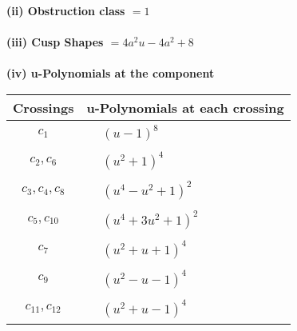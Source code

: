 \documentclass[1p]{elsarticle_modified}
\theoremstyle{definition}
\begin{document}
\flushleft \textbf{(ii) Obstruction class $= 1$}\\~\\
\flushleft \textbf{(iii) Cusp Shapes $= 4 a^2 u-4 a^2+8$}\\~\\
\newpage\renewcommand{\arraystretch}{1}
\flushleft \textbf{(iv) u-Polynomials at the component}\newline \\
\begin{tabular}{m{50pt}|m{274pt}}
Crossings & \hspace{64pt}u-Polynomials at each crossing \\
\hline $$\begin{aligned}c_{1}\end{aligned}$$&$\begin{aligned}
&(u-1)^8
\end{aligned}$\\
\hline $$\begin{aligned}c_{2},c_{6}\end{aligned}$$&$\begin{aligned}
&(u^2+1)^4
\end{aligned}$\\
\hline $$\begin{aligned}c_{3},c_{4},c_{8}\end{aligned}$$&$\begin{aligned}
&(u^4- u^2+1)^2
\end{aligned}$\\
\hline $$\begin{aligned}c_{5},c_{10}\end{aligned}$$&$\begin{aligned}
&(u^4+3 u^2+1)^2
\end{aligned}$\\
\hline $$\begin{aligned}c_{7}\end{aligned}$$&$\begin{aligned}
&(u^2+u+1)^4
\end{aligned}$\\
\hline $$\begin{aligned}c_{9}\end{aligned}$$&$\begin{aligned}
&(u^2- u-1)^4
\end{aligned}$\\
\hline $$\begin{aligned}c_{11},c_{12}\end{aligned}$$&$\begin{aligned}
&(u^2+u-1)^4
\end{aligned}$\\
\hline
\end{tabular}\\~\\
\end{document}

